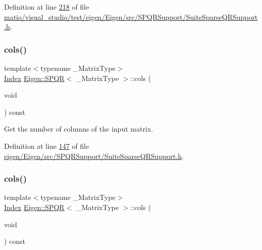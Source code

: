 Definition at line \hyperlink{matio_2visual__studio_2test_2eigen_2_eigen_2src_2_s_p_q_r_support_2_suite_sparse_q_r_support_8h_source_l00218}{218} of file \hyperlink{matio_2visual__studio_2test_2eigen_2_eigen_2src_2_s_p_q_r_support_2_suite_sparse_q_r_support_8h_source}{matio/visual\+\_\+studio/test/eigen/\+Eigen/src/\+S\+P\+Q\+R\+Support/\+Suite\+Sparse\+Q\+R\+Support.\+h}.

\mbox{\label{class_eigen_1_1_s_p_q_r_aa006d40963b05c7525b5ca0b02364d84}} 
\subsubsection{\texorpdfstring{cols()}{cols()}\hspace{0.1cm}{\footnotesize\ttfamily [1/2]}}
{\footnotesize\ttfamily template$<$typename \+\_\+\+Matrix\+Type$>$ \\
\hyperlink{namespace_eigen_a62e77e0933482dafde8fe197d9a2cfde}{Index} \hyperlink{class_eigen_1_1_s_p_q_r}{Eigen\+::\+S\+P\+QR}$<$ \+\_\+\+Matrix\+Type $>$\+::cols (\begin{DoxyParamCaption}\item[{void}]{ }\end{DoxyParamCaption}) const\hspace{0.3cm}{\ttfamily [inline]}}

Get the number of columns of the input matrix. 

Definition at line \hyperlink{eigen_2_eigen_2src_2_s_p_q_r_support_2_suite_sparse_q_r_support_8h_source_l00147}{147} of file \hyperlink{eigen_2_eigen_2src_2_s_p_q_r_support_2_suite_sparse_q_r_support_8h_source}{eigen/\+Eigen/src/\+S\+P\+Q\+R\+Support/\+Suite\+Sparse\+Q\+R\+Support.\+h}.

\mbox{\label{class_eigen_1_1_s_p_q_r_aa006d40963b05c7525b5ca0b02364d84}} 
\subsubsection{\texorpdfstring{cols()}{cols()}\hspace{0.1cm}{\footnotesize\ttfamily [2/2]}}
{\footnotesize\ttfamily template$<$typename \+\_\+\+Matrix\+Type$>$ \\
\hyperlink{namespace_eigen_a62e77e0933482dafde8fe197d9a2cfde}{Index} \hyperlink{class_eigen_1_1_s_p_q_r}{Eigen\+::\+S\+P\+QR}$<$ \+\_\+\+Matrix\+Type $>$\+::cols (\begin{DoxyParamCaption}\item[{void}]{ }\end{DoxyParamCaption}) const\hspace{0.3cm}{\ttfamily [inline]}}

